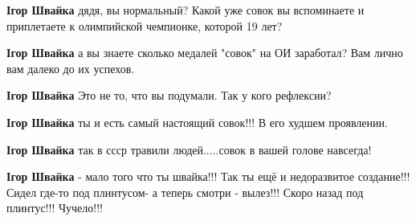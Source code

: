\begin{itemize}
\begin{itemize}
\textbf{Ігор Швайка} дядя, вы нормальный? Какой уже совок вы вспоминаете и приплетаете к олимпийской чемпионке, которой 19 лет?

 
\textbf{Ігор Швайка} а вы знаете сколько медалей "совок" на ОИ заработал? Вам лично вам далеко до их успехов.

 
\textbf{Ігор Швайка} Это не то, что вы подумали.
Так у кого рефлексии?

 
\textbf{Ігор Швайка} ты и есть самый настоящий совок!!! В его худшем проявлении.

 
\textbf{Ігор Швайка} так в ссср травили людей.....совок в вашей голове навсегда!

 
\textbf{Ігор Швайка} - мало того что ты швайка!!! Так ты ещё и недоразвитое создание!!! Сидел где-то под плинтусом- а теперь смотри - вылез!!! Скоро назад под плинтус!!! Чучело!!!

 

\end{itemize}
\end{itemize}
